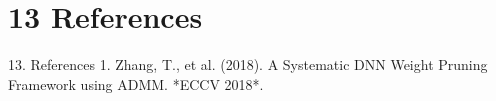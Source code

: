 \section{13 References}

 13. References
1. Zhang, T., et al. (2018). A Systematic DNN Weight Pruning Framework using ADMM. *ECCV 2018*.
